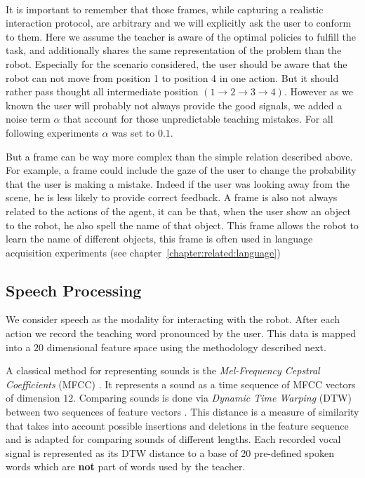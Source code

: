 \paragraph{} It is important to remember that those frames, while capturing a realistic interaction protocol, are arbitrary and we will explicitly ask the user to conform to them. Here we assume the teacher is aware of the optimal policies to fulfill the task, and additionally shares the same representation of the problem than the robot. Especially for the scenario considered, the user should be aware that the robot can not move from position 1 to position 4 in one action. But it should rather pass thought all intermediate position $(1 \rightarrow 2 \rightarrow 3 \rightarrow 4)$. However as we known the user will probably not always provide the good signals, we added a noise term $\alpha$ that account for those unpredictable teaching mistakes. For all following experiments $\alpha$ was set to $0.1$.

But a frame can be way more complex than the simple relation described above. For example, a frame could include the gaze of the user to change the probability that the user is making a mistake. Indeed if the user was looking away from the scene, he is less likely to provide correct feedback. A frame is also not always related to the actions of the agent, it can be that, when the user show an object to the robot, he also spell the name of that object. This frame allows the robot to learn the name of different objects, this frame is often used in language acquisition experiments (see chapter~\ref{chapter:related:language})

\subsection{Speech Processing}
\label{chapter:lfui:speechdata}

We consider speech as the modality for interacting with the robot. After each action we record the teaching word pronounced by the user. This data is mapped into a $20$ dimensional feature space using the methodology described next.  

A classical method for representing sounds is the \textit{Mel-Frequency Cepstral Coefficients} (MFCC) \cite{zheng2001comparison}. It represents a sound as a time sequence of MFCC vectors of dimension $12$. Comparing sounds is done via \textit{Dynamic Time Warping} (DTW) between two sequences of feature vectors \cite{sakoe1978dynamic}. This distance is a measure of similarity that takes into account possible insertions and deletions in the feature sequence and is adapted for comparing sounds of different lengths. Each recorded vocal signal is represented as its DTW distance to a base of 20 pre-defined spoken words which are \textbf{not} part of words used by the teacher.

